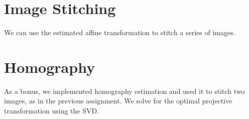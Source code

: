 \documentclass[a4paper,10pt]{article}
\begin{document}
\section{Image Stitching}
We can use the estimated affine transformation to stitch a series of images.

\section{Homography}
As a bonus, we implemented homography estimation and used it to stitch two images, as in the previous assignment.
We solve for the optimal projective transformation using the SVD.
\end{document}
